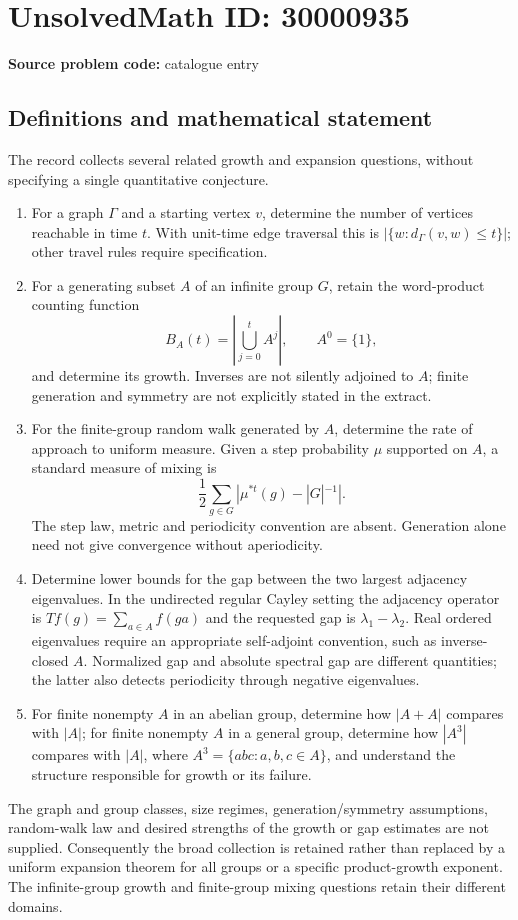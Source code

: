 \documentclass[11pt]{article}
\begin{document}
\section*{UnsolvedMath ID: 30000935}
\textbf{Source problem code:} catalogue entry
\subsection{Definitions and mathematical statement}
The record collects several related growth and expansion questions, without specifying a single quantitative conjecture.
\begin{enumerate}
\item For a graph $\Gamma$ and a starting vertex $v$, determine the number of vertices reachable in time $t$. With unit-time edge traversal this is $|\{w:d_\Gamma(v,w)\leq t\}|$; other travel rules require specification.
\item For a generating subset $A$ of an infinite group $G$, retain the word-product counting function
\[
B_A(t)=\left|\bigcup_{j=0}^{t}A^j\right|,\qquad A^0=\{1\},
\]
and determine its growth. Inverses are not silently adjoined to $A$; finite generation and symmetry are not explicitly stated in the extract.
\item For the finite-group random walk generated by $A$, determine the rate of approach to uniform measure. Given a step probability $\mu$ supported on $A$, a standard measure of mixing is
\[
\frac12\sum_{g\in G}|\mu^{*t}(g)-|G|^{-1}|.
\]
The step law, metric and periodicity convention are absent. Generation alone need not give convergence without aperiodicity.
\item Determine lower bounds for the gap between the two largest adjacency eigenvalues. In the undirected regular Cayley setting the adjacency operator is $Tf(g)=\sum_{a\in A}f(ga)$ and the requested gap is $\lambda_1-\lambda_2$. Real ordered eigenvalues require an appropriate self-adjoint convention, such as inverse-closed $A$. Normalized gap and absolute spectral gap are different quantities; the latter also detects periodicity through negative eigenvalues.
\item For finite nonempty $A$ in an abelian group, determine how $|A+A|$ compares with $|A|$; for finite nonempty $A$ in a general group, determine how $|A^3|$ compares with $|A|$, where $A^3=\{abc:a,b,c\in A\}$, and understand the structure responsible for growth or its failure.
\end{enumerate}
The graph and group classes, size regimes, generation/symmetry assumptions, random-walk law and desired strengths of the growth or gap estimates are not supplied. Consequently the broad collection is retained rather than replaced by a uniform expansion theorem for all groups or a specific product-growth exponent. The infinite-group growth and finite-group mixing questions retain their different domains.
\end{document}
